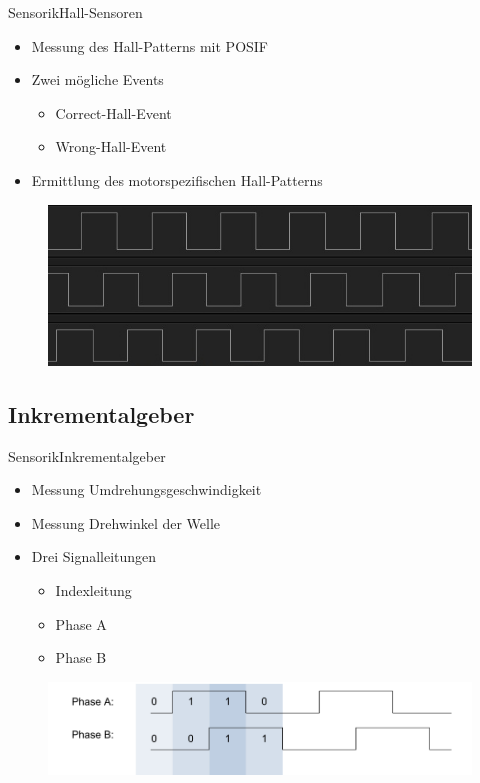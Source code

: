\begin{frame}{Sensorik}{Hall-Sensoren}	
 \begin{itemize}
 \item Messung des Hall-Patterns mit POSIF
 \item Zwei mögliche Events
	 \begin{itemize}
	 \item Correct-Hall-Event
	 \item Wrong-Hall-Event
	 \end{itemize}
 \item Ermittlung des motorspezifischen Hall-Patterns
 \end{itemize}
 \begin{figure} [htbp]
   \centering
   \includegraphics[scale=0.3]{Sensor/hall_pattern.jpg}
  \end{figure}
\end{frame}


\subsection{Inkrementalgeber}

\begin{frame}{Sensorik}{Inkrementalgeber}	
 \begin{itemize}
 \item Messung Umdrehungsgeschwindigkeit
 \item Messung Drehwinkel der Welle
 \item Drei Signalleitungen
 \begin{itemize}
 \item Indexleitung
 \item Phase A
 \item Phase B
 \end{itemize}
 \end{itemize}
 \begin{figure} [htbp]
   \centering
   \includegraphics[scale=0.4]{Sensor/quadrature_overview.PNG}
 \end{figure}
\end{frame}

